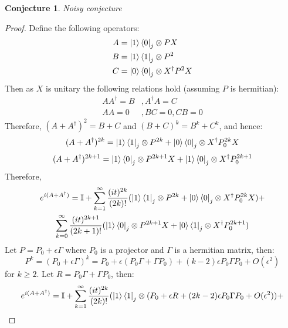 \documentclass[10pt]{amsart}
\newtheorem{conjecture}{Conjecture}
\begin{document}
\begin{conjecture}
Noisy conjecture
\end{conjecture}
\begin{proof}
    Define the following operators:
    \begin{align}
        A &= \ket{1}\bra{0}_j \otimes P X\\
        B &= \ket{1}\bra{1}_j\otimes P^2\\
        C &= \ket{0}\bra{0}_j\otimes X^{\dagger}P^2 X
    \end{align}
    Then as $X$ is unitary the following relations hold (assuming $P$ is hermitian):
    \begin{align*}
        AA^{\dagger} = B&, A^{\dagger} A = C\\
        AA = 0&, BC= 0 , CB = 0 
    \end{align*}
    Therefore, $(A+A^{\dagger})^2 = B+C$ and $(B+C)^k = B^k + C^k$, and hence:
    \begin{equation}
        (A+A^{\dagger})^{2k} = \ket{1}\bra{1}_j\otimes P^{2k} + \ket{0}\bra{0}_j\otimes X^{\dagger}P_0^{2k} X
    \end{equation}
    \begin{equation}
        (A+A^{\dagger})^{2k+1} = \ket{1}\bra{0}_j\otimes P^{2k+1}X + \ket{1}\bra{0}_j\otimes X^{\dagger}P_0^{2k+1}
    \end{equation}
    Therefore,
    \begin{multline}
        e^{i(A+A^{\dagger})} = \mathbb{I} + \sum_{k=1}^{\infty} \frac{(it)^{2k}}{(2k)!}(\ket{1}\bra{1}_j\otimes P^{2k} + \ket{0}\bra{0}_j\otimes X^{\dagger}P_0^{2k} X)+\\
        \sum_{k=0}^{\infty} \frac{(it)^{2k+1}}{(2k+1)!}(\ket{1}\bra{0}_j\otimes P^{2k+1}X + \ket{0}\bra{1}_j\otimes X^{\dagger}P_0^{2k+1})
    \end{multline}
    Let $P = P_0 + \epsilon \Gamma$ where $P_0$ is a projector and $\Gamma$ is a hermitian matrix, then:
    \begin{equation}
        P^k = (P_0 + \epsilon \Gamma)^k = P_0 + \epsilon(P_0 \Gamma + \Gamma P_0) + (k-2)\epsilon P_0 \Gamma P_0 + O(\epsilon^2)
    \end{equation}
    for $k\geq 2$. Let $R = P_0 \Gamma + \Gamma P_0$, then:
    \begin{multline}
        e^{i(A+A^{\dagger})} = \mathbb{I} + \sum_{k=1}^{\infty} \frac{(it)^{2k}}{(2k)!}(\ket{1}\bra{1}_j\otimes (P_0 + \epsilon R + (2k-2)\epsilon P_0 \Gamma P_0 + O(\epsilon^2)) +\\

\end{multline}
\end{proof}
\end{document}
